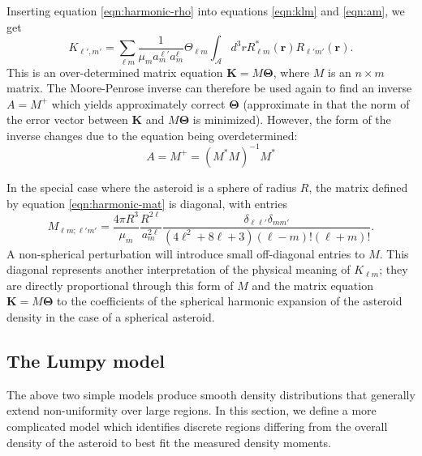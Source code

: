 \documentclass[fleqn,usenatbib]{mnras}
\begin{document}
Inserting equation \ref{eqn:harmonic-rho} into equations \ref{eqn:klm} and \ref{eqn:am}, we get 
\begin{equation}
  K_{\ell', m'} = \sum_{\ell m} \frac{1}{\mu_m a_m^{\ell'} a_m^\ell} \Theta_{\ell m} \int_\mathcal{A} d^3 r R_{\ell m}^*(\bm r) R_{\ell' m'}(\bm r).
  \label{eqn:harmonic-mat}
\end{equation}
This is an over-determined matrix equation $\bm K = M \bm \Theta$, where $M$ is an $n \times m$ matrix. The Moore-Penrose inverse can therefore be used again to find an inverse $A=M^+$ which yields approximately correct $\bm \Theta$ (approximate in that the norm of the error vector between $\bm K$ and $M \bm \Theta$ is minimized). However, the form of the inverse changes due to the equation being overdetermined:
\begin{equation}
  A=M^+ = (M^*M)^{-1} M^*
  \label{eqn:mpi-overdetermined}
\end{equation}

In the special case where the asteroid is a sphere of radius $R$, the matrix defined by equation \ref{eqn:harmonic-mat} is diagonal, with entries 
\begin{equation}
  M_{\ell m; \ell' m'} = \frac{4\pi R^3}{\mu_m} \frac{R^{2\ell}}{a_m^{2\ell}} \frac{\delta_{\ell \ell'} \delta_{m m'}}{(4\ell^2 + 8\ell + 3)(\ell - m)!(\ell+m)!}.
\end{equation}
A non-spherical perturbation will introduce small off-diagonal entries to $M$. This diagonal represents another interpretation of the physical meaning of $K_{\ell m}$; they are directly proportional through this form of $M$ and the matrix equation $\bm K = M \bm \Theta$ to the coefficients of the spherical harmonic expansion of the asteroid density in the case of a spherical asteroid.



\subsection{The Lumpy model}
\label{sec:lumpy}

The above two simple models produce smooth density distributions that generally extend non-uniformity over large regions. In this section, we define a more complicated model which identifies discrete regions differing from the overall density of the asteroid to best fit the measured density moments.
\end{document}
